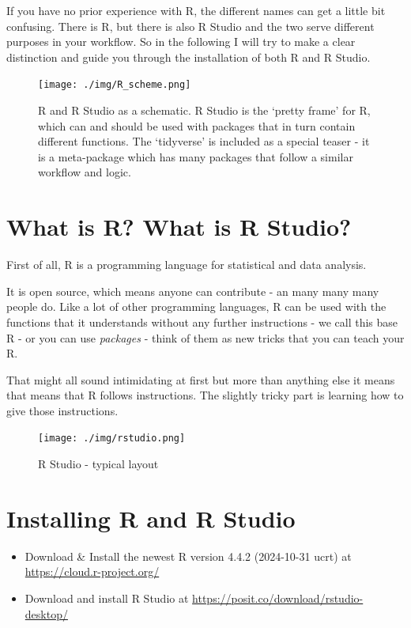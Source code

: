 \documentclass[
]{book}
\providecommand{\tightlist}{%
  \setlength{\itemsep}{0pt}\setlength{\parskip}{0pt}}
\begin{document}
If you have no prior experience with R, the different names can get a little bit confusing.
There is R, but there is also R Studio and the two serve different purposes in your workflow.
So in the following I will try to make a clear distinction and guide you through the installation of both R and R Studio.

\begin{figure}
\centering
\texttt{[image: ./img/R\_scheme.png]}
\caption{\label{fig:unnamed-chunk-1}R and R Studio as a schematic. R Studio is the `pretty frame' for R, which can and should be used with packages that in turn contain different functions. The `tidyverse' is included as a special teaser - it is a meta-package which has many packages that follow a similar workflow and logic.}
\end{figure}

\section{What is R? What is R Studio?}\label{what-is-r-what-is-r-studio}

First of all, R is a programming language for statistical and data analysis.

It is open source, which means anyone can contribute - an many many many people do.
Like a lot of other programming languages, R can be used with the functions that it understands without any further instructions - we call this base R - or you can use \emph{packages} - think of them as new tricks that you can teach your R.

That might all sound intimidating at first but more than anything else it means that means that R follows instructions.
The slightly tricky part is learning how to give those instructions.

\begin{figure}
\centering
\texttt{[image: ./img/rstudio.png]}
\caption{R Studio - typical layout}
\end{figure}

\section{Installing R and R Studio}\label{installing-r-and-r-studio}

\begin{itemize}
\tightlist
\item
  Download \& Install the newest R version 4.4.2 (2024-10-31 ucrt) at \url{https://cloud.r-project.org/}
\item
  Download and install R Studio at \url{https://posit.co/download/rstudio-desktop/}
\end{itemize}
\end{document}
